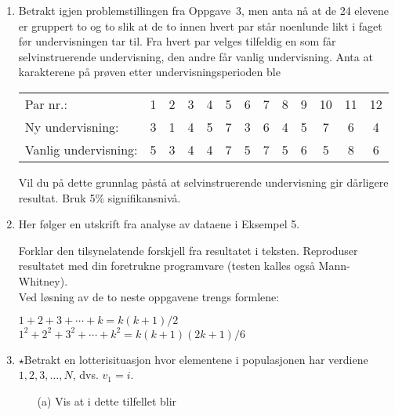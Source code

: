 \begin{enumerate}
\item
Betrakt igjen problemstillingen fra Oppgave~3, men anta nå at de
24 elevene er gruppert to og to slik at de to innen hvert par står
noenlunde likt i faget før undervisningen tar til.  Fra hvert par
velges tilfeldig en som får selvinstruerende undervisning, den
andre får vanlig undervisning.  Anta at karakterene på
prøven etter undervisningsperioden ble
\begin{center}
\begin{tabular}{lcccccccccccc}
Par nr.:            & 1 & 2 & 3 & 4 & 5 & 6 & 7 & 8 & 9 & 10 & 11 & 12 \\
Ny undervisning:    & 3 & 1 & 4 & 5 & 7 & 3 & 6 & 4 & 5 &  7 &  6 &  4 \\
Vanlig undervisning:& 5 & 3 & 4 & 4 & 7 & 5 & 7 & 5 & 6 &  5 &  8 &  6
\end{tabular}
\end{center}
Vil du på dette grunnlag påstå at selvinstruerende 
undervisning gir dårligere resultat.  Bruk 5\% signifikansnivå.

\item
Her følger en utskrift fra analyse av dataene i Eksempel 5.

\begin{center}  \end{center}
Forklar den tilsynelatende forskjell fra resultatet i teksten.
Reproduser resultatet med din foretrukne programvare (testen kalles også
Mann-Whitney).\\



Ved løsning av de to neste oppgavene trengs formlene:
\begin{center}
 $ 1+2+3+\cdots +k=k(k+1)/2   $ \\
 $ 1^2+2^2+3^2+\cdots +k^2=k(k+1)(2k+1)/6   $ 
\end{center}
\item
 $\star$Betrakt en lotterisituasjon hvor elementene i populasjonen har 
verdiene $1, 2, 3, \ldots, N$, dvs. $v_1 = i$.
\begin{itemize}
\item[(a)] Vis at i dette tilfellet blir 


\end{itemize}
\end{enumerate}
